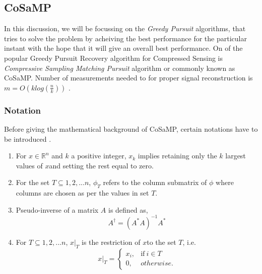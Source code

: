 \documentclass[12pt]{article}
\theoremstyle{definition}
\def\x{$x$\hspace{0.1in}}
\def\cosamp{CoSaMP\hspace{0.1in}}
\begin{document}
\subsection{CoSaMP}
In this discussion, we will be focussing on the \textit{Greedy Pursuit} algorithms, that tries to solve the problem
by acheiving the best performance for the particular instant with the hope that it will give an overall best performance.
On of the popular Greedy Pursuit Recovery algorithm for Compressed Sensing is \textit{Compressive Sampling
Matching Pursuit} algorithm or commonly known as \cosamp. Number of measurements needed to for proper signal reconstruction is 
$m=O(k log(\frac{n}{k}))$ \cite{Needell-CoSaMP}. 
\subsubsection{Notation}
Before giving the mathematical background of \cosamp, certain notations have to be introduced \cite{Needell-CoSaMP}.
\begin{enumerate}
  \item For $x \in \mathbb{R}^n$ and $k$ a positive integer, $x_k$ implies retaining only the $k$ largest
values of \x and setting the rest equal to zero.
  
  \item For the set $T \subseteq {1,2,...n}$, $\phi_T$ refers to the column submatrix of $\phi$ where columns
  are chosen as per the values in set $T$.
  
  \item Pseudo-inverse of a matrix $A$ is defined as, 
  \begin{equation}
   A^\dagger= (A^\ast A)^{-1} A^\ast
  \end{equation}

  \item For $T \subseteq {1,2,...n}$, $x|_T$ is the restriction of \x to the set $T$, i.e. 
  \begin{equation}
   x|_T = 
   \begin{cases}
    x_i, & \text{if} \ i \in T\\
    0, & otherwise.
   \end{cases}
  \end{equation}

\end{enumerate}
\end{document}
